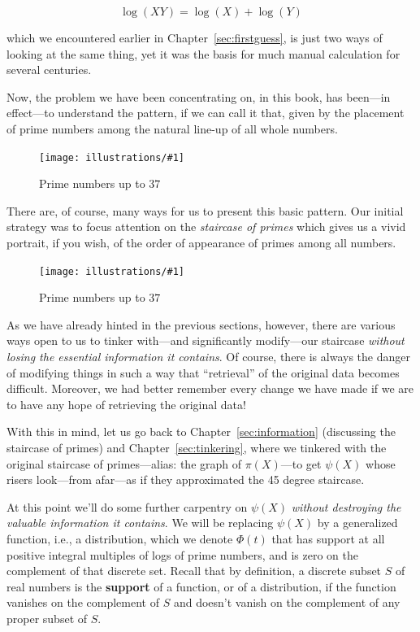 \documentclass[openany]{book}
\newcommand{\ill}[3]{%
   \begin{figure}[H]%
   \vspace{-2ex}
   \centering%
   \texttt{[image: illustrations/\#1]}%
   \caption{#3}%
   \vspace{-2ex}
    \end{figure}}
\theoremstyle{plain}
\theoremstyle{definition}
\begin{document}
{  $$\log(XY) = \log(X) + \log(Y)$$

  which we encountered earlier in Chapter~\ref{sec:firstguess}, is
  just two ways of looking at the same thing, yet it was the basis for
  much manual calculation for several centuries.




  Now, the problem we have been concentrating on, in this book, has
  been---in effect---to understand the pattern, if we can call it
  that, given by the placement of prime numbers among the natural
  line-up of all whole numbers.
\ill{primes_line}{1}{Prime numbers up to $37$}

 There are, of course, many ways for us to present this basic
 pattern. Our initial strategy was to focus attention on the {\it
   staircase of primes} which gives us a vivid portrait, if you wish,
 of the order of appearance of primes among all numbers.
\ill{PN_38}{.5}{Prime numbers up to $37$}

 As we have already hinted in the previous sections, however, there
 are various ways open to us to tinker with---and significantly
 modify---our staircase {\it without losing the essential information
   it contains}. Of course, there is always the danger of modifying
 things in such a way that ``retrieval'' of the original data becomes
 difficult.  Moreover, we had better remember every change we have
 made if we are to have any hope of retrieving the original data!

 With this in mind, let us go back to Chapter~\ref{sec:information}
 (discussing the staircase of primes) and Chapter~\ref{sec:tinkering},
 where we tinkered with the original staircase of primes---alias: the
 graph of $\pi(X)$---to get $\psi(X)$ whose risers look---from
 afar---as if they approximated the 45 degree staircase.%


   At this point we'll do some further carpentry on $\psi(X)$ {\it without destroying the valuable
   information it contains}. We will be replacing  $\psi(X)$ by a generalized function, i.e., a
   distribution, which we denote $\Phi(t)$ that has support at all positive integral multiples
     of logs of prime numbers, and is  zero on the complement of that discrete set.  Recall that
     by definition, a discrete subset $S$ of real numbers is  the  {\bf support} of a function,
     or of a distribution, if the function vanishes on the complement of  $S$ and doesn't vanish
     on the complement of any proper subset of $S$.

}
\end{document}
